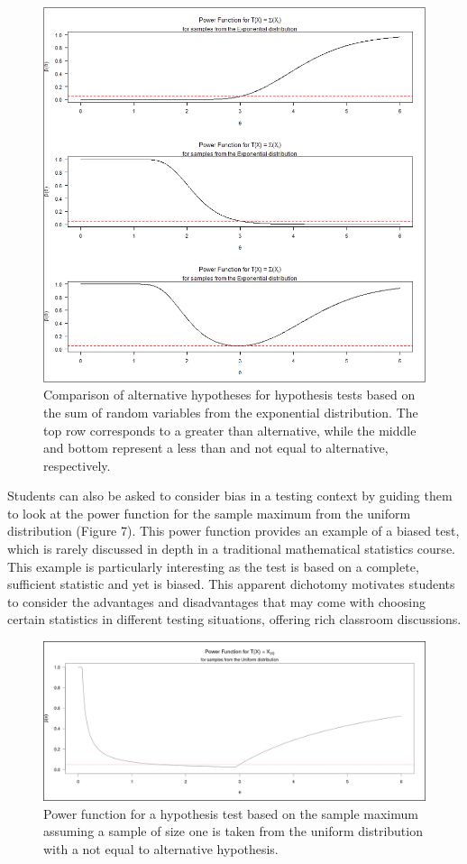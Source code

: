 \documentclass{TISE}
\begin{document}
\begin{figure}[H]
	\centering
	\includegraphics[scale=1]{fig6.png}
	\caption{Comparison of alternative hypotheses for hypothesis tests based on the sum of random variables from the exponential distribution. The top row corresponds to a greater than alternative, while the middle and bottom represent a less than and not equal to alternative, respectively.}
\end{figure}

Students can also be asked to consider bias in a testing context by guiding them to look at the power function for the sample maximum from the uniform distribution (Figure 7). This power function provides an example of a biased test, which is rarely discussed in depth in a traditional mathematical statistics course. This example is particularly interesting as the test is based on a complete, sufficient statistic and yet is biased. This apparent dichotomy motivates students to consider the advantages and disadvantages that may come with choosing certain statistics in different testing situations, offering rich classroom discussions.

\newpage

\begin{figure}[H]
	\centering
	\includegraphics[width=\linewidth]{fig7.png}
	\caption{Power function for a hypothesis test based on the sample maximum assuming a sample of size one is taken from the uniform distribution with a not equal to alternative hypothesis.}
\end{figure}
\end{document}
